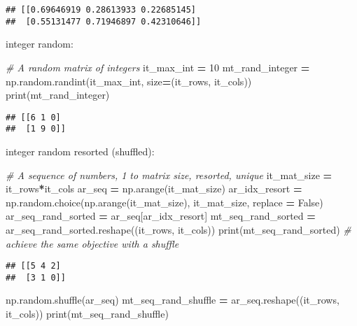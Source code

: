 \documentclass[
]{book}
\newenvironment{Shaded}{\begin{snugshade}}{\end{snugshade}}
\newcommand{\BuiltInTok}[1]{#1}
\newcommand{\CommentTok}[1]{\textcolor[rgb]{0.56,0.35,0.01}{\textit{#1}}}
\newcommand{\DecValTok}[1]{\textcolor[rgb]{0.00,0.00,0.81}{#1}}
\newcommand{\NormalTok}[1]{#1}
\newcommand{\OperatorTok}[1]{\textcolor[rgb]{0.81,0.36,0.00}{\textbf{#1}}}
\newcommand{\VariableTok}[1]{\textcolor[rgb]{0.00,0.00,0.00}{#1}}
\begin{document}
\begin{verbatim}
## [[0.69646919 0.28613933 0.22685145]
##  [0.55131477 0.71946897 0.42310646]]
\end{verbatim}

integer random:

\begin{Shaded}
\begin{Highlighting}[]
\CommentTok{# A random matrix of integers}
\NormalTok{it_max_int }\OperatorTok{=} \DecValTok{10}
\NormalTok{mt_rand_integer }\OperatorTok{=}\NormalTok{ np.random.randint(it_max_int, size}\OperatorTok{=}\NormalTok{(it_rows, it_cols))}
\BuiltInTok{print}\NormalTok{(mt_rand_integer)}
\end{Highlighting}
\end{Shaded}

\begin{verbatim}
## [[6 1 0]
##  [1 9 0]]
\end{verbatim}

integer random resorted (shuffled):

\begin{Shaded}
\begin{Highlighting}[]
\CommentTok{# A sequence of numbers, 1 to matrix size, resorted, unique}
\NormalTok{it_mat_size }\OperatorTok{=}\NormalTok{ it_rows}\OperatorTok{*}\NormalTok{it_cols}
\NormalTok{ar_seq }\OperatorTok{=}\NormalTok{ np.arange(it_mat_size)}
\NormalTok{ar_idx_resort }\OperatorTok{=}\NormalTok{ np.random.choice(np.arange(it_mat_size), it_mat_size, replace }\OperatorTok{=} \VariableTok{False}\NormalTok{)}
\NormalTok{ar_seq_rand_sorted }\OperatorTok{=}\NormalTok{ ar_seq[ar_idx_resort]}
\NormalTok{mt_seq_rand_sorted }\OperatorTok{=}\NormalTok{ ar_seq_rand_sorted.reshape((it_rows, it_cols))}
\BuiltInTok{print}\NormalTok{(mt_seq_rand_sorted)}
\CommentTok{# achieve the same objective with a shuffle}
\end{Highlighting}
\end{Shaded}

\begin{verbatim}
## [[5 4 2]
##  [3 1 0]]
\end{verbatim}

\begin{Shaded}
\begin{Highlighting}[]
\NormalTok{np.random.shuffle(ar_seq)}
\NormalTok{mt_seq_rand_shuffle }\OperatorTok{=}\NormalTok{ ar_seq.reshape((it_rows, it_cols))}
\BuiltInTok{print}\NormalTok{(mt_seq_rand_shuffle)}
\end{Highlighting}
\end{Shaded}
\end{document}
